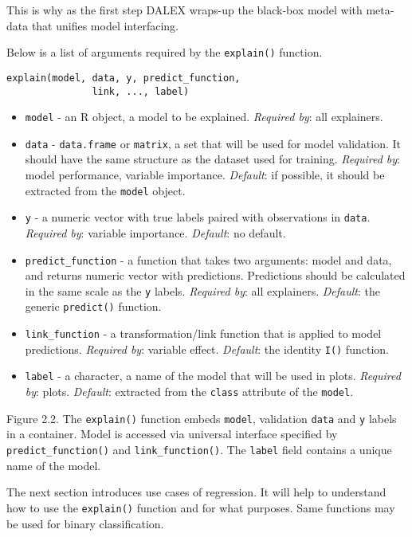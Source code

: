 \documentclass[]{book}
\providecommand{\tightlist}{%
  \setlength{\itemsep}{0pt}\setlength{\parskip}{0pt}}
\theoremstyle{definition}
\theoremstyle{definition}
\theoremstyle{definition}
\theoremstyle{remark}
\begin{document}
This is why as the first step DALEX wraps-up the black-box model with
meta-data that unifies model interfacing.

Below is a list of arguments required by the \texttt{explain()}
function.

\begin{verbatim}
explain(model, data, y, predict_function, 
               link, ..., label)
\end{verbatim}

\begin{itemize}
\tightlist
\item
  \texttt{model} - an R object, a model to be explained. \emph{Required
  by}: all explainers.
\item
  \texttt{data} - \texttt{data.frame} or \texttt{matrix}, a set that
  will be used for model validation. It should have the same structure
  as the dataset used for training. \emph{Required by}: model
  performance, variable importance. \emph{Default}: if possible, it
  should be extracted from the \texttt{model} object.
\item
  \texttt{y} - a numeric vector with true labels paired with
  observations in \texttt{data}. \emph{Required by}: variable
  importance. \emph{Default}: no default.
\item
  \texttt{predict\_function} - a function that takes two arguments:
  model and data, and returns numeric vector with predictions.
  Predictions should be calculated in the same scale as the \texttt{y}
  labels. \emph{Required by}: all explainers. \emph{Default}: the
  generic \texttt{predict()} function.
\item
  \texttt{link\_function} - a transformation/link function that is
  applied to model predictions. \emph{Required by}: variable effect.
  \emph{Default}: the identity \texttt{I()} function.
\item
  \texttt{label} - a character, a name of the model that will be used in
  plots. \emph{Required by}: plots. \emph{Default}: extracted from the
  \texttt{class} attribute of the \texttt{model}.
\end{itemize}

{Figure 2.2. The \texttt{explain()} function embeds \texttt{model},
validation \texttt{data} and \texttt{y} labels in a container. Model is
accessed via universal interface specified by
\texttt{predict\_function()} and \texttt{link\_function()}. The
\texttt{label} field contains a unique name of the model. }

The next section introduces use cases of regression. It will help to
understand how to use the \texttt{explain()} function and for what
purposes. Same functions may be used for binary classification.
\end{document}

